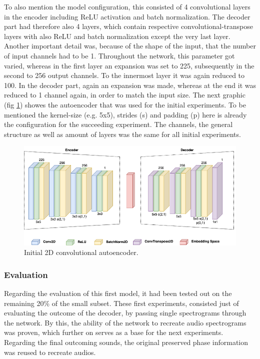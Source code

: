To also mention the model configuration, this consisted of 4 convolutional layers in the encoder including ReLU activation and batch normalization. The decoder part had therefore also 4 layers, which contain respective convolutional-transpose layers with also ReLU and batch normalization except the very last layer. Another important detail was, because of the shape of the input, that the number of input channels had to be 1. Throughout the network, this parameter got varied, whereas in the first layer an expansion was set to 225, subsequently in the second to 256 output channels. To the innermost layer it was again reduced to 100. In the decoder part, again an expansion was made, whereas at the end it was reduced to 1 channel again, in order to match the input size. The next graphic (fig \ref{fig:cae_2D_init}) showes the autoencoder that was used for the initial experiments. To be mentioned the kernel-size (e.g. 5x5), strides (s) and padding (p) here is already the configuration for the succeeding experiment. The channels, the general structure as well as amount of layers was the same for all initial experiments.

 \begin{figure}[htb!]
	\caption{Initial 2D convolutional autoencoder.}
	\label{fig:cae_2D_init}
	\centering
	\includegraphics[width=\textwidth]{images/experiments/autoencoder_init.png}
\end{figure}

\subsubsection{Evaluation}
Regarding the evaluation of this first model, it had been tested out on the remaining 20\% of the small subset. These first experiments, consisted just of evaluating the outcome of the decoder, by passing single spectrograms through the network. By this, the ability of the network to recreate audio spectrograms was proven, which further on serves as a base for the next experiments. Regarding the final outcoming sounds, the original preserved phase information was reused to recreate audios.

